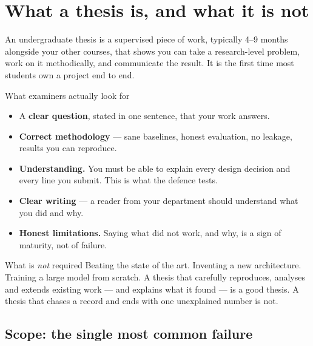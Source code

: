 \documentclass[11pt,a4paper]{article}
\begin{document}
\tableofcontents
\thispagestyle{fancy}
\clearpage

\section{What a thesis is, and what it is not}

An undergraduate thesis is a supervised piece of work, typically 4--9 months
alongside your other courses, that shows you can take a research-level problem,
work on it methodically, and communicate the result. It is the first time most
students own a project end to end.

\begin{cbox}{What examiners actually look for}
\begin{itemize}
  \item A \textbf{clear question}, stated in one sentence, that your work
        answers.
  \item \textbf{Correct methodology} --- sane baselines, honest evaluation, no
        leakage, results you can reproduce.
  \item \textbf{Understanding.} You must be able to explain every design
        decision and every line you submit. This is what the defence tests.
  \item \textbf{Clear writing} --- a reader from your department should
        understand what you did and why.
  \item \textbf{Honest limitations.} Saying what did not work, and why, is a
        sign of maturity, not of failure.
\end{itemize}
\end{cbox}

\begin{wbox}{What is \emph{not} required}
Beating the state of the art. Inventing a new architecture. Training a large
model from scratch. A thesis that carefully reproduces, analyses and extends
existing work --- and explains what it found --- is a good thesis. A thesis
that chases a record and ends with one unexplained number is not.
\end{wbox}

\subsection{Scope: the single most common failure}
\end{document}
